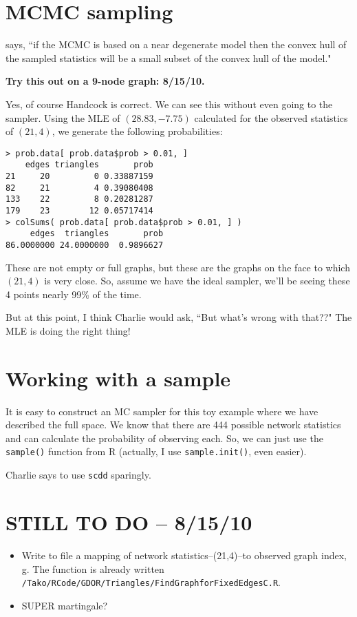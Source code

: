 \documentclass{amsbook}
\theoremstyle{definition}
\theoremstyle{remark}
\begin{document}
\section{MCMC sampling}
\citet[p. 11]{Handcock:Degeneracy} says, ``if the MCMC is based on a near degenerate model then the convex hull of the sampled statistics will be a small subset of the convex hull of the model."

\textbf{Try this out on a 9-node graph: 8/15/10.}

Yes, of course Handcock is correct.  We can see this without even going to the sampler. Using the MLE of $(28.83, -7.75)$ calculated for the observed statistics of $(21,4)$, we generate the following probabilities:
\begin{verbatim}
> prob.data[ prob.data$prob > 0.01, ]
    edges triangles       prob
21     20         0 0.33887159
82     21         4 0.39080408
133    22         8 0.20281287
179    23        12 0.05717414
> colSums( prob.data[ prob.data$prob > 0.01, ] )
     edges  triangles       prob 
86.0000000 24.0000000  0.9896627 
\end{verbatim}
These are not empty or full graphs, but these are the graphs on the face to which $(21,4)$ is very close.  So, assume we have the ideal sampler, we'll be seeing these 4 points nearly 99\% of the time.  

But at this point, I think Charlie would ask, ``But what's wrong with that??"  The MLE is doing the right thing!  

\section{Working with a sample}

It is easy to construct an MC sampler for this toy example where we have described the full space.  We know that there are 444 possible network statistics and can calculate the probability of observing each.  So, we can just use the \texttt{sample()} function from R (actually, I use \texttt{sample.init()}, even easier).

Charlie says to use \texttt{scdd} sparingly.

\section{STILL TO DO -- 8/15/10}

\begin{itemize}
\item Write to file a mapping of network statistics--(21,4)--to observed graph index, g.  The function is already written \texttt{/Tako/RCode/GDOR/Triangles/FindGraphforFixedEdgesC.R}.
\item SUPER martingale?
\end{itemize}
\end{document}
